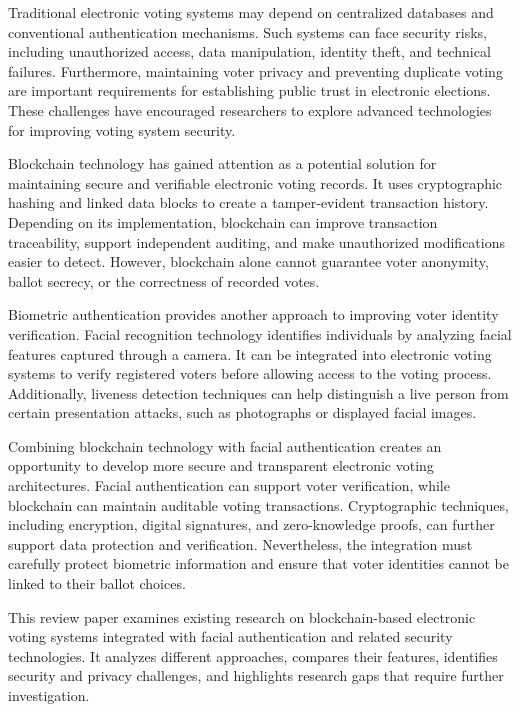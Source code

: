 \documentclass[12pt]{report}
\begin{document}
	Traditional electronic voting systems may depend on centralized databases and conventional authentication mechanisms. Such systems can face security risks, including unauthorized access, data manipulation, identity theft, and technical failures. Furthermore, maintaining voter privacy and preventing duplicate voting are important requirements for establishing public trust in electronic elections. These challenges have encouraged researchers to explore advanced technologies for improving voting system security.
	
	Blockchain technology has gained attention as a potential solution for maintaining secure and verifiable electronic voting records. It uses cryptographic hashing and linked data blocks to create a tamper-evident transaction history. Depending on its implementation, blockchain can improve transaction traceability, support independent auditing, and make unauthorized modifications easier to detect. However, blockchain alone cannot guarantee voter anonymity, ballot secrecy, or the correctness of recorded votes.
	
	Biometric authentication provides another approach to improving voter identity verification. Facial recognition technology identifies individuals by analyzing facial features captured through a camera. It can be integrated into electronic voting systems to verify registered voters before allowing access to the voting process. Additionally, liveness detection techniques can help distinguish a live person from certain presentation attacks, such as photographs or displayed facial images.
	
	Combining blockchain technology with facial authentication creates an opportunity to develop more secure and transparent electronic voting architectures. Facial authentication can support voter verification, while blockchain can maintain auditable voting transactions. Cryptographic techniques, including encryption, digital signatures, and zero-knowledge proofs, can further support data protection and verification. Nevertheless, the integration must carefully protect biometric information and ensure that voter identities cannot be linked to their ballot choices.
	
	This review paper examines existing research on blockchain-based electronic voting systems integrated with facial authentication and related security technologies. It analyzes different approaches, compares their features, identifies security and privacy challenges, and highlights research gaps that require further investigation.
	
\end{document}
